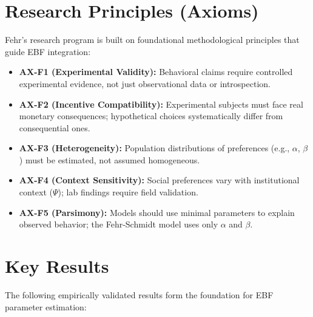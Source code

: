 \section{Research Principles (Axioms)}
\label{sec:feh-axioms}

Fehr's research program is built on foundational methodological principles that
guide EBF integration:

\begin{itemize}
    \item \textbf{AX-F1 (Experimental Validity):} Behavioral claims require controlled
    experimental evidence, not just observational data or introspection.

    \item \textbf{AX-F2 (Incentive Compatibility):} Experimental subjects must face
    real monetary consequences; hypothetical choices systematically differ from
    consequential ones.

    \item \textbf{AX-F3 (Heterogeneity):} Population distributions of preferences
    (e.g., $\alpha$, $\beta$) must be estimated, not assumed homogeneous.

    \item \textbf{AX-F4 (Context Sensitivity):} Social preferences vary with
    institutional context ($\Psi$); lab findings require field validation.

    \item \textbf{AX-F5 (Parsimony):} Models should use minimal parameters to explain
    observed behavior; the Fehr-Schmidt model uses only $\alpha$ and $\beta$.
\end{itemize}


\section{Key Results}
\label{sec:feh-results}

The following empirically validated results form the foundation for EBF parameter
estimation:

